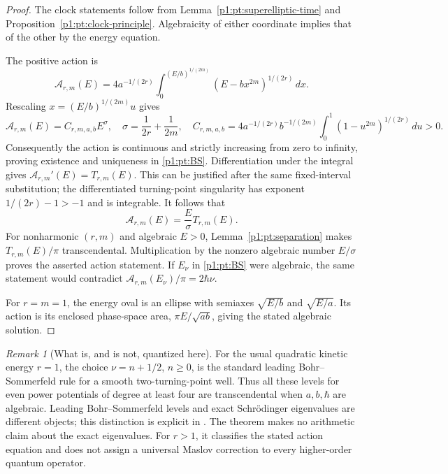 \documentclass[11pt,a4paper]{article}
\theoremstyle{definition}
\theoremstyle{remark}
\newtheorem{remark}[theorem]{Remark}
\numberwithin{equation}{section}
\begin{document}
\begin{proof}
The clock statements follow from Lemma~\ref{p1:pt:superelliptic-time}
and Proposition~\ref{p1:pt:clock-principle}.  Algebraicity of either
coordinate implies that of the other by the energy equation.

The positive action is
\[
 \mathcal A_{r,m}(E)
 =4a^{-1/(2r)}\int_0^{(E/b)^{1/(2m)}}
                 (E-bx^{2m})^{1/(2r)}\,dx.
\]
Rescaling $x=(E/b)^{1/(2m)}u$ gives
\begin{equation}\label{p1:pt:action-scaling}
 \mathcal A_{r,m}(E)=C_{r,m,a,b} E^\sigma,
 \quad \sigma=\frac1{2r}+\frac1{2m},\quad
 C_{r,m,a,b}=4a^{-1/(2r)}b^{-1/(2m)}
     \int_0^1(1-u^{2m})^{1/(2r)}\,du>0.
\end{equation}
Consequently the action is continuous and strictly increasing from
zero to infinity, proving existence and uniqueness in \eqref{p1:pt:BS}.
Differentiation under the integral gives
$\mathcal A_{r,m}'(E)=T_{r,m}(E)$.  This can be justified after the
same fixed-interval substitution; the differentiated turning-point
singularity has exponent $1/(2r)-1>-1$ and is integrable.
It follows that
\begin{equation}\label{p1:pt:action-period}
 \mathcal A_{r,m}(E)=\frac{E}{\sigma}T_{r,m}(E).
\end{equation}
For nonharmonic $(r,m)$ and algebraic $E>0$, Lemma~\ref{p1:pt:separation}
makes $T_{r,m}(E)/\pi$ transcendental.  Multiplication by the nonzero
algebraic number $E/\sigma$ proves the asserted action statement.
If $E_\nu$ in \eqref{p1:pt:BS} were algebraic, the same statement would
contradict $\mathcal A_{r,m}(E_\nu)/\pi=2\hbar\nu$.

For $r=m=1$, the energy oval is an ellipse with semiaxes
$\sqrt{E/b}$ and $\sqrt{E/a}$.  Its action is its enclosed phase-space
area, $\pi E/\sqrt{ab}$, giving the stated algebraic solution.
\end{proof}

\begin{remark}[What is, and is not, quantized here]
For the usual quadratic kinetic energy $r=1$, the choice
$\nu=n+1/2$, $n\ge0$, is the standard leading Bohr--Sommerfeld rule
for a smooth two-turning-point well.  Thus all these levels for even
power potentials of degree at least four are transcendental when
$a,b,\hbar$ are algebraic.  Leading Bohr--Sommerfeld levels and exact
Schr\"odinger eigenvalues are different objects; this distinction is
explicit in \cite{p1:pt-DVT}.  The theorem makes no arithmetic claim about
the exact eigenvalues.  For $r>1$, it classifies the stated action
equation and does not assign a universal Maslov correction to every
higher-order quantum operator.
\end{remark}
\end{document}
